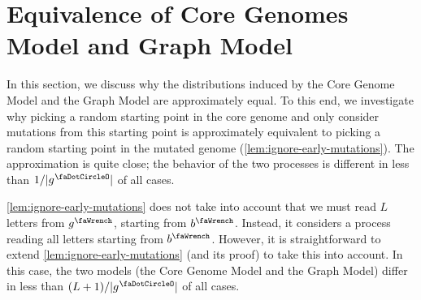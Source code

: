 

% 	

% 	

% 	


\section{Equivalence of Core Genomes Model and Graph Model} \label{app:model-equivalence}
In this section, we discuss why the distributions induced by the Core Genome Model and the Graph Model are approximately equal.
To this end, we investigate why picking a random starting point in the core genome and only consider mutations from this starting point is approximately equivalent to picking a random starting point in the mutated genome (\cref{lem:ignore-early-mutations}).
The approximation is quite close; the behavior of the two processes is different in less than $1/|\genome^\gcore|$ of all cases.

\cref{lem:ignore-early-mutations} does not take into account that we must read $L$ letters from $\genome^\gmut$, starting from $\startInGenome^\gmut$.
Instead, it considers a process reading all letters starting from $\startInGenome^\gmut$.
However, it is straightforward to extend \cref{lem:ignore-early-mutations} (and its proof) to take this into account.
In this case, the two models (the Core Genome Model and the Graph Model) differ in less than $(L+1)/|\genome^\gcore|$ of all cases.

